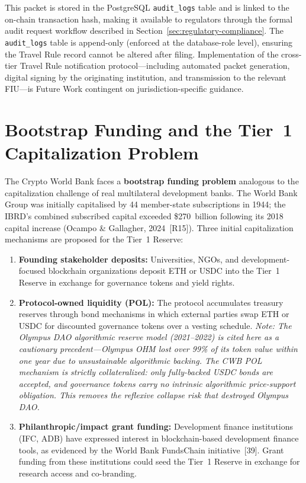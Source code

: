 \documentclass[12pt,a4paper]{report}
\begin{document}
\noindent This packet is stored in the PostgreSQL \texttt{audit\_logs} table and is linked to the on-chain transaction hash, making it available to regulators through the formal audit request workflow described in Section~\ref{sec:regulatory-compliance}. The \texttt{audit\_logs} table is append-only (enforced at the database-role level), ensuring the Travel Rule record cannot be altered after filing. Implementation of the cross-tier Travel Rule notification protocol---including automated packet generation, digital signing by the originating institution, and transmission to the relevant FIU---is Future Work contingent on jurisdiction-specific guidance.

\section{Bootstrap Funding and the Tier~1 Capitalization Problem}

The Crypto World Bank faces a \textbf{bootstrap funding problem} analogous to the capitalization challenge of real multilateral development banks. The World Bank Group was initially capitalised by 44 member-state subscriptions in 1944; the IBRD's combined subscribed capital exceeded \$270~billion following its 2018 capital increase (Ocampo \& Gallagher, 2024~[R15]). Three initial capitalization mechanisms are proposed for the Tier~1 Reserve:

\begin{enumerate}[noitemsep]
\item \textbf{Founding stakeholder deposits:} Universities, NGOs, and development-focused blockchain organizations deposit ETH or USDC into the Tier~1 Reserve in exchange for governance tokens and yield rights.
\item \textbf{Protocol-owned liquidity (POL):} The protocol accumulates treasury reserves through bond mechanisms in which external parties swap ETH or USDC for discounted governance tokens over a vesting schedule. \textit{Note: The Olympus DAO algorithmic reserve model (2021--2022) is cited here as a cautionary precedent---Olympus OHM lost over 99\% of its token value within one year due to unsustainable algorithmic backing. The CWB POL mechanism is strictly collateralized: only fully-backed USDC bonds are accepted, and governance tokens carry no intrinsic algorithmic price-support obligation. This removes the reflexive collapse risk that destroyed Olympus DAO.}
\item \textbf{Philanthropic/impact grant funding:} Development finance institutions (IFC, ADB) have expressed interest in blockchain-based development finance tools, as evidenced by the World Bank FundsChain initiative~[39]. Grant funding from these institutions could seed the Tier~1 Reserve in exchange for research access and co-branding.
\end{enumerate}
\end{document}
